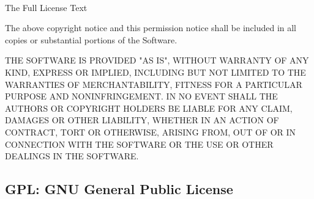 \begin{frame}{\insertsubsection\ }
\begin{fancycolumns}
\begin{note}{The Full License Text}
{				The above copyright notice and this permission notice shall be included in all copies or substantial portions of the Software.
				
				THE SOFTWARE IS PROVIDED "AS IS", WITHOUT WARRANTY OF ANY KIND, EXPRESS OR IMPLIED, INCLUDING BUT NOT LIMITED TO THE WARRANTIES OF MERCHANTABILITY, FITNESS FOR A PARTICULAR PURPOSE AND NONINFRINGEMENT. IN NO EVENT SHALL THE AUTHORS OR COPYRIGHT HOLDERS BE LIABLE FOR ANY CLAIM, DAMAGES OR OTHER LIABILITY, WHETHER IN AN ACTION OF CONTRACT, TORT OR OTHERWISE, ARISING FROM, OUT OF OR IN CONNECTION WITH THE SOFTWARE OR THE USE OR OTHER DEALINGS IN THE SOFTWARE.}
		\end{note}
	\end{fancycolumns}
\end{frame}

\subsection{GPL: GNU General Public License}
